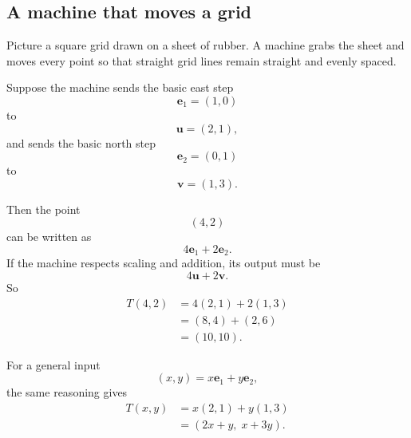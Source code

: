 \subsection{A machine that moves a grid}

Picture a square grid drawn on a sheet of rubber.  A machine grabs the sheet and moves
every point so that straight grid lines remain straight and evenly spaced.

Suppose the machine sends the basic east step
\[
    \mathbf e_1=(1,0)
\]
to
\[
    \mathbf u=(2,1),
\]
and sends the basic north step
\[
    \mathbf e_2=(0,1)
\]
to
\[
    \mathbf v=(1,3).
\]

Then the point
\[
    (4,2)
\]
can be written as
\[
    4\mathbf e_1+2\mathbf e_2.
\]
If the machine respects scaling and addition, its output must be
\[
    4\mathbf u+2\mathbf v.
\]
So
\[
\begin{aligned}
T(4,2)
&=
4(2,1)+2(1,3)\\
&=
(8,4)+(2,6)\\
&=
(10,10).
\end{aligned}
\]

For a general input
\[
    (x,y)=x\mathbf e_1+y\mathbf e_2,
\]
the same reasoning gives
\[
\begin{aligned}
T(x,y)
&=
x(2,1)+y(1,3)\\
&=
(2x+y,\;x+3y).
\end{aligned}
\]

